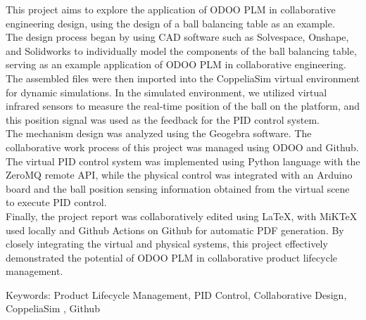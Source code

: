 \justifying\fontsize{14pt}{16pt}\sectionef\hspace{12pt}\quad This project aims to explore the application of ODOO PLM in collaborative engineering design, using the design of a ball balancing table as an example.
\\[12pt]

\justifying\fontsize{14pt}{16pt}\sectionef\hspace{12pt}\quad The design process began by using CAD software such as Solvespace, Onshape, and Solidworks to individually model the components of the ball balancing table, serving as an example application of ODOO PLM in collaborative engineering. The assembled files were then imported into the CoppeliaSim virtual environment for dynamic simulations. In the simulated environment, we utilized virtual infrared sensors to measure the real-time position of the ball on the platform, and this position signal was used as the feedback for the PID control system. \\

\justifying\fontsize{14pt}{16pt}\sectionef\hspace{12pt}\quad The mechanism design was analyzed using the Geogebra software. The collaborative work process of this project was managed using ODOO and Github. The virtual PID control system was implemented using Python language with the ZeroMQ remote API, while the physical control was integrated with an Arduino board and the ball position sensing information obtained from the virtual scene to execute PID control.\\

\justifying\fontsize{14pt}{16pt}\sectionef\hspace{12pt}\quad Finally, the project report was collaboratively edited using LaTeX, with MiKTeX used locally and Github Actions on Github for automatic PDF generation. By closely integrating the virtual and physical systems, this project effectively demonstrated the potential of ODOO PLM in collaborative product lifecycle management.\\

\vspace{6cm}
\begin{hangparas}{1.5cm}{1}
Keywords: Product Lifecycle Management, PID Control, Collaborative Design, CoppeliaSim , Github
\end{hangparas}



